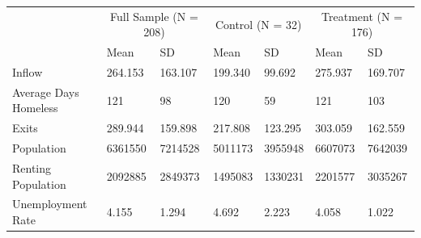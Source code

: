\begin{tabular}{lllllll}
\toprule
 & \multicolumn{2}{c}{Full Sample (N = 208)} & \multicolumn{2}{c}{Control (N = 32)} & \multicolumn{2}{c}{Treatment (N = 176)} \\
 & Mean & SD & Mean & SD & Mean & SD \\
\midrule
Inflow & 264.153 & 163.107 & 199.340 & 99.692 & 275.937 & 169.707 \\
Average Days Homeless & 121 & 98 & 120 & 59 & 121 & 103 \\
Exits & 289.944 & 159.898 & 217.808 & 123.295 & 303.059 & 162.559 \\
Population & 6361550 & 7214528 & 5011173 & 3955948 & 6607073 & 7642039 \\
Renting Population & 2092885 & 2849373 & 1495083 & 1330231 & 2201577 & 3035267 \\
Unemployment Rate & 4.155 & 1.294 & 4.692 & 2.223 & 4.058 & 1.022 \\
\bottomrule
\end{tabular}
